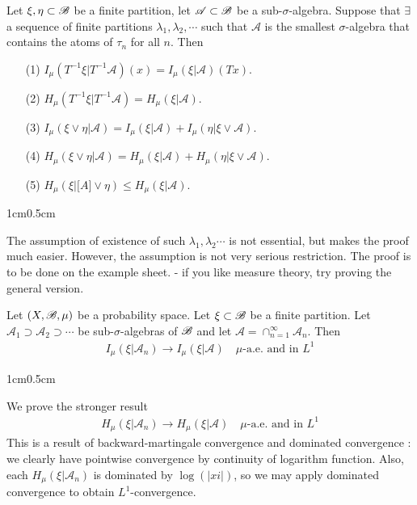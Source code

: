 \documentclass[12pt,a4paper]{report}
\newenvironment{proof}
{\begin{changemargin}{1cm}{0.5cm} 
	}%
	{\end{changemargin}
}
\begin{document}
\lem Let $\xi, \eta \subset \mathscr{B}$ be a finite partition, let $\mathscr{A} \subset \mathscr{B}$ be a sub-$\sigma$-algebra. Suppose that $\exists$ a sequence of finite partitions $\lambda_1, \lambda_2, \cdots$ such that $\mathscr{A}$ is the smallest $\sigma$-algebra that contains the atoms of $\tau_n$ for all $n$. Then
\begin{itemize}
\item[(1)] $I_{\mu}(T^{-1}\xi | T^{-1} \mathscr{A})(x) = I_{\mu}(\xi | \mathscr{A}) (Tx)$.
\item[(2)] $H_{\mu}(T^{-1}\xi | T^{-1} \mathscr{A})= H_{\mu}(\xi | \mathscr{A})$.
\item[(3)] $I_{\mu}(\xi \vee \eta  | \mathscr{A}) = I_{\mu}(\xi | \mathscr{A}) + I_{\mu}(\eta | \xi \vee \mathscr{A})$.
\item[(4)] $H_{\mu}(\xi \vee \eta  | \mathscr{A}) = H_{\mu}(\xi | \mathscr{A}) + H_{\mu}(\eta | \xi \vee \mathscr{A})$.
\item[(5)] $H_{\mu}(\xi | \mathscr[A] \vee \eta) \leq H_{\mu}(\xi | \mathscr{A})$.
\end{itemize}
\begin{proof}
The assumption of existence of such $\lambda_1, \lambda_2 \cdots$ is not essential, but makes the proof much easier. However, the assumption is not very serious restriction. The proof is to be done on the example sheet. - if you like measure theory, try proving the general version.
\end{proof}
\s

\prop Let $(X,\mathscr{B}, \mu)$ be a probability space. Let $\xi \subset \mathscr{B}$ be a finite partition. Let $\mathscr{A}_1 \supset \mathscr{A}_2 \supset \cdots$ be sub-$\sigma$-algebras of $\mathscr{B}$ and let $\mathscr{A} = \cap_{n=1}^{\infty} \mathscr{A}_n$. Then
\begin{align*}
I_{\mu} (\xi | \mathscr{A}_n) \rightarrow I_{\mu}(\xi |\mathscr{A}) \quad \mu \text{-a.e. and in } L^1
\end{align*}
\begin{proof}
\pf We prove the stronger result
\begin{align*}
H_{\mu} (\xi | \mathscr{A}_n) \rightarrow H_{\mu}(\xi |\mathscr{A}) \quad \mu \text{-a.e. and in } L^1
\end{align*}
This is a result of backward-martingale convergence and dominated convergence : we clearly have pointwise convergence by continuity of logarithm function. Also, each $H_{\mu}(\xi | \mathscr{A}_n)$ is dominated by $\log(|xi|)$, so we may apply dominated convergence to obtain $L^1$-convergence.

\eop
\end{proof}
\s
\end{document}
